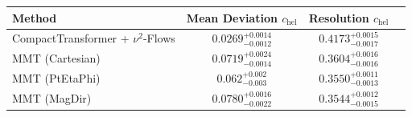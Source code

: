    \begin{tabular}{lccc}
        \toprule
        Method & Mean Deviation $c_{\text{hel}}$ & Resolution $c_{\text{hel}}$ \\
        \midrule
        CompactTransformer + $\nu^2$-Flows & $0.0269^{+0.0014}_{-0.0012}$ & $0.4173^{+0.0015}_{-0.0017}$ \\
        MMT (Cartesian) & $0.0719^{+0.0024}_{-0.0014}$ & $0.3604^{+0.0016}_{-0.0016}$ \\
        MMT (PtEtaPhi) & $0.062^{+0.002}_{-0.003}$ & $0.3550^{+0.0011}_{-0.0013}$ \\
        MMT (MagDir) & $0.0780^{+0.0016}_{-0.0022}$ & $0.3544^{+0.0012}_{-0.0015}$ \\
        \bottomrule
    \end{tabular}